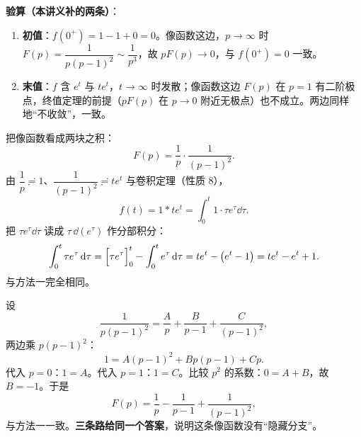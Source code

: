 \documentclass[11pt]{ctexart}
\begin{document}
\textbf{验算（本讲义补的两条）}：

\begin{enumerate}
\item \textbf{初值}：$f(0^{+})=1-1+0=0$。像函数这边，$p\to\infty$ 时 $F(p)=\dfrac{1}{p(p-1)^{2}}\sim\dfrac{1}{p^{3}}$，故 $pF(p)\to0$，与 $f(0^{+})=0$ 一致。
\item \textbf{末值}：$f$ 含 $e^{t}$ 与 $te^{t}$，$t\to\infty$ 时发散；像函数这边 $F(p)$ 在 $p=1$ 有二阶极点，终值定理的前提（$pF(p)$ 在 $p\to0$ 附近无极点）也不成立。两边同样地“不收敛”，一致。
\end{enumerate}



把像函数看成两块之积：
\[ F(p)=\frac{1}{p}\cdot\frac{1}{(p-1)^{2}} .\]
由 $\dfrac{1}{p}\risingdotseq1$、$\dfrac{1}{(p-1)^{2}}\risingdotseq te^{t}$ 与卷积定理（性质 8），
\[ f(t)=1*te^{t}=\int_0^{t}1\cdot\tau e^{\tau}\dd\tau .\]
把 $\tau e^{\tau}\dd\tau$ 读成 $\tau\,\dd(e^{\tau})$ 作分部积分：
\[
\int_0^{t}\tau e^{\tau}\,\mathrm{d}\tau
=\Bigl[\tau e^{\tau}\Bigr]_{0}^{t}-\int_0^{t}e^{\tau}\,\mathrm{d}\tau
=te^{t}-\left(e^{t}-1\right)=te^{t}-e^{t}+1 .
\]
与方法一完全相同。


设
\[ \frac{1}{p(p-1)^{2}}=\frac{A}{p}+\frac{B}{p-1}+\frac{C}{(p-1)^{2}} ,\]
两边乘 $p(p-1)^{2}$：
\[ 1=A(p-1)^{2}+Bp(p-1)+Cp .\]
代入 $p=0$：$1=A$。代入 $p=1$：$1=C$。比较 $p^{2}$ 的系数：$0=A+B$，故 $B=-1$。于是
\[ F(p)=\frac{1}{p}-\frac{1}{p-1}+\frac{1}{(p-1)^{2}} ,\]
与方法一一致。\textbf{三条路给同一个答案}，说明这条像函数没有“隐藏分支”。


\end{document}
